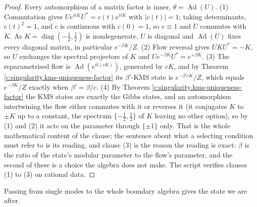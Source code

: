 \documentclass[11pt]{article}
\theoremstyle{definition}
\theoremstyle{plain}
\begin{document}
\begin{proof}
Every automorphism of a matrix factor is inner, $\theta = \operatorname{Ad}(U)$. (1) Commutation gives $Ue^{itK}U^{*} = c(t)e^{itK}$ with $|c(t)| = 1$; taking determinants, $c(t)^{2} = 1$, and $c$ is continuous with $c(0) = 1$, so $c \equiv 1$ and $U$ commutes with $K$. As $K = \operatorname{diag}(-\tfrac12, \tfrac12)$ is nondegenerate, $U$ is diagonal and $\operatorname{Ad}(U)$ fixes every diagonal matrix, in particular $e^{-\beta K}/Z$. (2) Flow reversal gives $UKU^{*} = -K$, so $U$ exchanges the spectral projectors of $K$ and $Ue^{-\beta K}U^{*} = e^{+\beta K}$. (3) The reparametrised flow is $\operatorname{Ad}(e^{it(cK)})$, generated by $cK$, and by Theorem \ref{c:singularity.kms-uniqueness-factor} its $\beta'$-KMS state is $e^{-\beta' cK}/Z$, which equals $e^{-\beta K}/Z$ exactly when $\beta' = \beta/c$. (4) By Theorem \ref{c:singularity.kms-uniqueness-factor} the KMS states are exactly the Gibbs states, and an automorphism intertwining the flow either commutes with it or reverses it (it conjugates $K$ to $\pm K$ up to a constant, the spectrum $\{-\tfrac12, \tfrac12\}$ of $K$ leaving no other option), so by (1) and (2) it acts on the parameter through $\{\pm 1\}$ only. That is the whole mathematical content of the clause; the sentence about what a selecting condition must refer to is its reading, and clause (3) is the reason the reading is exact: $\beta$ is the ratio of the state's modular parameter to the flow's parameter, and the second of these is a choice the algebra does not make. The script verifies clauses (1) to (3) on rational data.

\end{proof}

Passing from single modes to the whole boundary algebra gives the state we are after.
\end{document}
